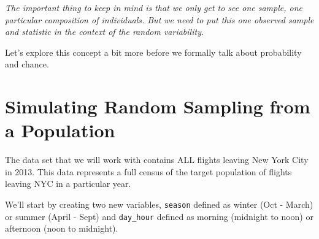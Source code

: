 \documentclass[
]{book}
\newenvironment{Shaded}{\begin{snugshade}}{\end{snugshade}}
\newcommand{\DataTypeTok}[1]{\textcolor[rgb]{0.13,0.29,0.53}{#1}}
\newcommand{\DecValTok}[1]{\textcolor[rgb]{0.00,0.00,0.81}{#1}}
\newcommand{\KeywordTok}[1]{\textcolor[rgb]{0.13,0.29,0.53}{\textbf{#1}}}
\newcommand{\NormalTok}[1]{#1}
\newcommand{\OperatorTok}[1]{\textcolor[rgb]{0.81,0.36,0.00}{\textbf{#1}}}
\newcommand{\StringTok}[1]{\textcolor[rgb]{0.31,0.60,0.02}{#1}}
\begin{document}
\emph{The important thing to keep in mind is that we only get to see one sample, one particular composition of individuals. But we need to put this one observed sample and statistic in the context of the random variability.}

Let's explore this concept a bit more before we formally talk about probability and chance.

\hypertarget{simulating-random-sampling-from-a-population}{%
\section{Simulating Random Sampling from a Population}\label{simulating-random-sampling-from-a-population}}

The data set that we will work with contains ALL flights leaving New York City in 2013. This data represents a full census of the target population of flights leaving NYC in a particular year.

We'll start by creating two new variables, \texttt{season} defined as winter (Oct - March) or summer (April - Sept) and \texttt{day\_hour} defined as morning (midnight to noon) or afternoon (noon to midnight).

\begin{Shaded}
\end{Shaded}
\end{document}
